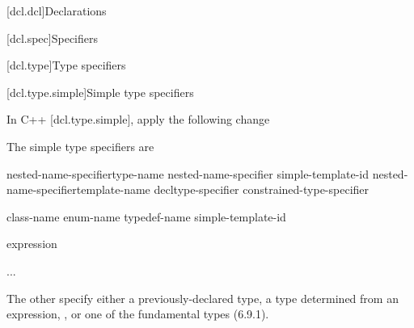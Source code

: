 
[dcl.dcl]{Declarations}

[dcl.spec]{Specifiers}

\setcounter{subsection}{6}
[dcl.type]{Type specifiers}

\setcounter{subsubsection}{1}
[dcl.type.simple]{Simple type specifiers}

In C++ [dcl.type.simple], apply the following change

\begin{std.txt}
The simple type specifiers are

\begin{bnf}
\br
    nested-name-specifier\opt type-name\br
    nested-name-specifier  simple-template-id\br
    nested-name-specifier\opt template-name\br
    \br
    \br
    \br
    \br
    \br
    \br
    \br
    \br
    \br
    \br
    \br
    \br
    \br
    \br
    decltype-specifier\br
    constrained-type-specifier\br
\end{bnf}

\begin{bnf}
\br
    class-name\br
    enum-name\br
    typedef-name\br
    simple-template-id
\end{bnf}

\begin{bnf}
\br
   \terminal{(} expression \terminal{)}\br
   \terminal{(}  \terminal{)}
\end{bnf}

\begin{bnf}
\br
\end{bnf}

\begin{bnf}
\br
  \added{\terminal{::}}\br
  \br
  \br
  \br
\end{bnf}

...

The other  specify either a
previously-declared type, a type determined from an expression, , or one of the fundamental types (6.9.1).
\end{std.txt}

